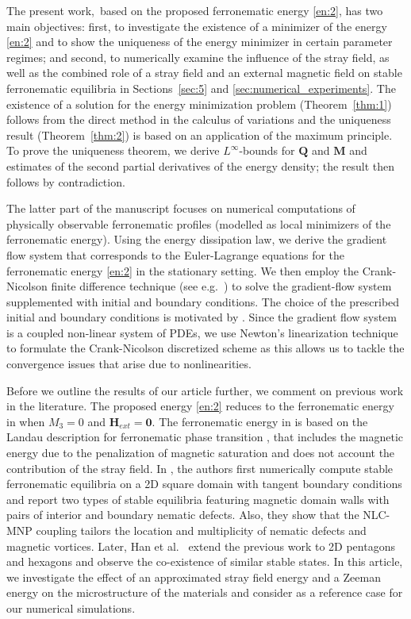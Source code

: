 \documentclass{article}
\def\Qvec{\mathbf{Q}}
\def \Mvec{\mathbf{M}}
\def\Hvec{\mathbf{H}}
\begin{document}
The present work,~based on the proposed ferronematic energy \eqref{en:2}, has two main objectives: first, to investigate the existence of a minimizer of the energy \eqref{en:2} and to show the uniqueness of the energy minimizer in certain parameter regimes;
 and second, to numerically examine the influence of the stray field, as well as the combined role of a stray field and an external magnetic field on stable ferronematic equilibria in Sections~\ref{sec:5} and \ref{sec:numerical_experiments}. The existence of a solution for the energy minimization problem (Theorem~\ref{thm:1}) follows from the direct method in the calculus of variations and the uniqueness result (Theorem~\ref{thm:2}) is based on an application of the maximum principle.  To prove the uniqueness theorem, we derive $L^{\infty}$-bounds for $\Qvec$ and $\Mvec$ and estimates of the second partial derivatives of the energy density; the result then follows by contradiction. 

The latter part of the manuscript focuses on numerical computations of physically observable ferronematic profiles (modelled as local minimizers of the ferronematic energy). Using the energy dissipation law, we derive the gradient flow system that corresponds to the Euler-Lagrange equations for the ferronematic energy \eqref{en:2} in the stationary setting. We then employ the Crank-Nicolson finite difference technique (see e.g.\ \cite{Burden-Faires}) to solve the gradient-flow system supplemented with initial and boundary conditions. The choice of the prescribed initial and boundary conditions is motivated by \cite{Canevari}. Since the gradient flow system is a coupled non-linear system of PDEs, we use Newton's linearization technique to formulate the Crank-Nicolson discretized scheme as this allows us to tackle the convergence issues that arise due to nonlinearities.

Before we outline the results of our article further, we comment on previous work in the literature. The proposed energy \eqref{en:2} reduces to the ferronematic energy in \cite{Bisht2020} when $M_3=0$ and $\Hvec_{ext}=\mathbf{0}$. The ferronematic energy in \cite{Bisht2020} is based on the Landau description for ferronematic phase transition \cite{Pleiner}, that includes the magnetic energy due to the penalization of magnetic saturation and does not account the contribution of the stray field. In \cite{Bisht2020}, the authors first numerically compute stable ferronematic equilibria on a 2D square domain with tangent boundary conditions and report two types of stable equilibria featuring magnetic domain walls with pairs of interior and boundary nematic defects. Also, they show that the NLC-MNP coupling tailors the location and multiplicity of nematic defects and magnetic vortices. Later, Han et al.~\cite{han2021tailored} extend the previous work to 2D pentagons and hexagons and observe the co-existence of similar stable states. In this article, we investigate the effect of an approximated stray field energy and a Zeeman energy on the microstructure of the materials and consider \cite{Bisht2020} as a reference case for our numerical simulations.   
\end{document}
